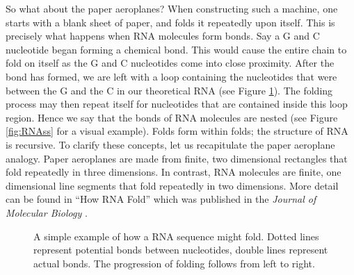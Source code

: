 \documentclass[12pt, a4paper]{article}
\begin{document}
So what about the paper aeroplanes? When constructing such a machine, one starts with a blank sheet of paper, and folds it repeatedly upon itself. This is precisely what happens when RNA molecules form bonds. Say a G and C nucleotide began forming a chemical bond. This would cause the entire chain to fold on itself as the G and C nucleotides come into close proximity. After the bond has formed, we are left with a loop containing the nucleotides that were between the G and the C in our theoretical RNA (see Figure \ref{fig:RNAssBasic}). The folding process may then repeat itself for nucleotides that are contained inside this loop region. Hence we say that the bonds of RNA molecules are nested (see Figure \ref{fig:RNAss} for a visual example). Folds form within folds; the structure of RNA is recursive. To clarify these concepts, let us recapitulate the paper aeroplane analogy. Paper aeroplanes are made from finite, two dimensional rectangles that fold repeatedly in three dimensions. In contrast, RNA molecules are finite, one dimensional line segments that fold repeatedly in two dimensions. More detail can be found in ``How RNA Fold'' which was published in the \emph{Journal of Molecular Biology} \cite{tinoco1999rna}.

\begin{figure}
\begin{center}
\end{center}
\caption{A simple example of how a RNA sequence might fold. Dotted lines represent potential bonds between nucleotides, double lines represent actual bonds. The progression of folding follows from left to right.}
\label{fig:RNAssBasic}
\end{figure}
\end{document}
